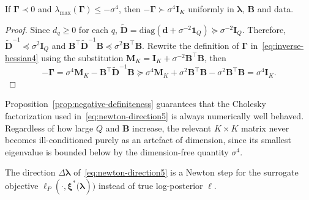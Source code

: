 \begin{proposition}
    If $\bm{\Gamma}\prec 0$ and $\lambda_{\text{max}}(\bm{\Gamma})\leq -\sigma^{4}$, then $-\bm{\Gamma}\succ \sigma^{4}\mathbf{I}_{K}$ uniformly in $\bm{\lambda}$, $\mathbf{B}$ and data.
    \label{prop:negative-definiteness}
\end{proposition}

\begin{proof}
    Since $d_{q}\geq 0$ for each $q$, $\tilde{\mathbf{D}}=\text{diag}(\mathbf{d}+\sigma^{-2}\mathbf{1}_{Q})\succeq \sigma^{-2}\mathbf{I}_{Q}$. Therefore, $\tilde{\mathbf{D}}^{-1}\preceq \sigma^{2}\mathbf{I}_{Q}$ and $\mathbf{B}^{\top}\tilde{\mathbf{D}}^{-1}\mathbf{B}\preceq \sigma^{2}\mathbf{B}^{\top}\mathbf{B}$.
    Rewrite the definition of $\bm{\Gamma}$ in~\eqref{eq:inverse-hessian4} using the substitution $\mathbf{M}_{K}=\mathbf{I}_{K}+\sigma^{-2}\mathbf{B}^{\top}\mathbf{B}$, then
    \[
        -\bm{\Gamma}=\sigma^{4}\mathbf{M}_{K}-\mathbf{B}^{\top}\tilde{\mathbf{D}}^{-1}\mathbf{B}\succeq \sigma^{4}\mathbf{M}_{K}+\sigma^{2}\mathbf{B}^{\top}\mathbf{B}-\sigma^{2}\mathbf{B}^{\top}\mathbf{B}=\sigma^{4}\mathbf{I}_{K}.
    \]
\end{proof}

Proposition~\ref{prop:negative-definiteness} guarantees that the Cholesky factorization used in~\eqref{eq:newton-direction5} is always numerically well behaved. Regardless of how large $Q$ and $\mathbf{B}$ increase, the relevant $K\times K$ matrix never becomes ill-conditioned purely as an artefact of dimension, since its smallest eigenvalue is bounded below by the dimension-free quantity $\sigma^{4}$.

The direction $\Delta \bm{\lambda}$ of~\eqref{eq:newton-direction5} is a Newton step for the surrogate objective $\ell_{P}(\cdot, \bm{\xi}^{*}\bigl(\bm{\lambda})\bigr)$ instead of true log-posterior $\ell$.

